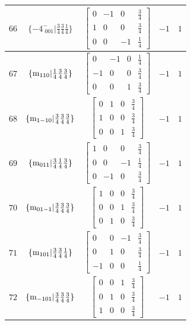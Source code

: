 \documentclass[fleqn,8pt]{jsarticle}
\begin{document}
\begin{longtable}{ccccc}
$ 66 $ & $ \{-4^{-}_{\,\,001}|\frac{3}{4} \frac{3}{4} \frac{1}{4}\} $ & $ \begin{bmatrix} 0 & -1 & 0 & \frac{3}{4} \\ 1 & 0 & 0 & \frac{3}{4} \\ 0 & 0 & -1 & \frac{1}{4} \end{bmatrix} $ & $ -1 $ & $ 1 $ \\ \hline
$ 67 $ & $ \{{\rm m}_{110}|\frac{1}{4} \frac{3}{4} \frac{3}{4}\} $ & $ \begin{bmatrix} 0 & -1 & 0 & \frac{1}{4} \\ -1 & 0 & 0 & \frac{3}{4} \\ 0 & 0 & 1 & \frac{3}{4} \end{bmatrix} $ & $ -1 $ & $ 1 $ \\ \hline
$ 68 $ & $ \{{\rm m}_{1-10}|\frac{3}{4} \frac{3}{4} \frac{3}{4}\} $ & $ \begin{bmatrix} 0 & 1 & 0 & \frac{3}{4} \\ 1 & 0 & 0 & \frac{3}{4} \\ 0 & 0 & 1 & \frac{3}{4} \end{bmatrix} $ & $ -1 $ & $ 1 $ \\ \hline
$ 69 $ & $ \{{\rm m}_{011}|\frac{3}{4} \frac{1}{4} \frac{3}{4}\} $ & $ \begin{bmatrix} 1 & 0 & 0 & \frac{3}{4} \\ 0 & 0 & -1 & \frac{1}{4} \\ 0 & -1 & 0 & \frac{3}{4} \end{bmatrix} $ & $ -1 $ & $ 1 $ \\ \hline
$ 70 $ & $ \{{\rm m}_{01-1}|\frac{3}{4} \frac{3}{4} \frac{3}{4}\} $ & $ \begin{bmatrix} 1 & 0 & 0 & \frac{3}{4} \\ 0 & 0 & 1 & \frac{3}{4} \\ 0 & 1 & 0 & \frac{3}{4} \end{bmatrix} $ & $ -1 $ & $ 1 $ \\ \hline
$ 71 $ & $ \{{\rm m}_{101}|\frac{3}{4} \frac{3}{4} \frac{1}{4}\} $ & $ \begin{bmatrix} 0 & 0 & -1 & \frac{3}{4} \\ 0 & 1 & 0 & \frac{3}{4} \\ -1 & 0 & 0 & \frac{1}{4} \end{bmatrix} $ & $ -1 $ & $ 1 $ \\ \hline
$ 72 $ & $ \{{\rm m}_{-101}|\frac{3}{4} \frac{3}{4} \frac{3}{4}\} $ & $ \begin{bmatrix} 0 & 0 & 1 & \frac{3}{4} \\ 0 & 1 & 0 & \frac{3}{4} \\ 1 & 0 & 0 & \frac{3}{4} \end{bmatrix} $ & $ -1 $ & $ 1 $ \\ \hline

\end{longtable}
\end{document}
